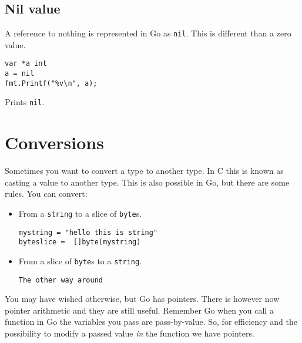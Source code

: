 \noindent

\subsection{Nil value}
A reference to nothing is represented in Go as \lstinline{nil}. This is
different than a zero value. 

\begin{lstlisting}
var *a int
a = nil
fmt.Printf("%v\n", a);
\end{lstlisting}
Prints \lstinline{nil}.

\section{Conversions}
\label{sec:conversions}
Sometimes you want to convert a type to another type. In C this is known
as casting a value to another type. This is also possible in Go, but
there are some rules.
You can convert:
\begin{itemize}
\item{
From a \lstinline{string} to a slice of \lstinline{byte}s.
\begin{lstlisting}
mystring = "hello this is string"
byteslice =  []byte(mystring)
\end{lstlisting}
}
\item{
From a slice of \lstinline{byte}s to a \lstinline{string}.
\begin{lstlisting}
The other way around
\end{lstlisting}
}
\end{itemize}














You may have wished otherwise, but Go has pointers.
There is however now pointer arithmetic and they are still useful.
Remember Go when you call a function in Go the variables you pass are
pass-by-value. So, for efficiency and the possibility to modify a
passed value \emph{in} the function we have pointers.

